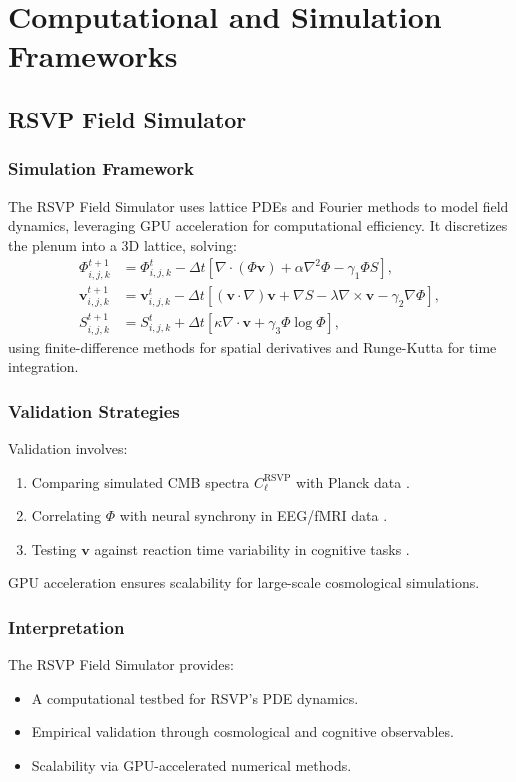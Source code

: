 \documentclass[12pt]{report}
\begin{document}
\part{Computational and Simulation Frameworks}

\chapter{RSVP Field Simulator}
\label{app:R}
\section{Simulation Framework}
The RSVP Field Simulator uses lattice PDEs and Fourier methods to model field dynamics, leveraging GPU acceleration for computational efficiency. It discretizes the plenum into a 3D lattice, solving:
\begin{align}
\Phi_{i,j,k}^{t+1} &= \Phi_{i,j,k}^t - \Delta t \left[ \nabla \cdot (\Phi \mathbf{v}) + \alpha \nabla^2 \Phi - \gamma_1 \Phi S \right], \\
\mathbf{v}_{i,j,k}^{t+1} &= \mathbf{v}_{i,j,k}^t - \Delta t \left[ (\mathbf{v}\cdot\nabla)\mathbf{v} + \nabla S - \lambda \nabla \times \mathbf{v} - \gamma_2 \nabla \Phi \right], \\
S_{i,j,k}^{t+1} &= S_{i,j,k}^t + \Delta t \left[ \kappa \nabla \cdot \mathbf{v} + \gamma_3 \Phi \log \Phi \right],
\end{align}
using finite-difference methods for spatial derivatives and Runge-Kutta for time integration.

\section{Validation Strategies}
Validation involves:
\begin{enumerate}
    \item Comparing simulated CMB spectra \(C_\ell^{\text{RSVP}}\) with Planck data \citep{Planck2020}.
    \item Correlating \(\Phi\) with neural synchrony in EEG/fMRI data \citep{Fries2005}.
    \item Testing \(\mathbf{v}\) against reaction time variability in cognitive tasks \citep{SemanticField2025}.
\end{enumerate}
GPU acceleration ensures scalability for large-scale cosmological simulations.

\section{Interpretation}
The RSVP Field Simulator provides:
\begin{itemize}
    \item A computational testbed for RSVP’s PDE dynamics.
    \item Empirical validation through cosmological and cognitive observables.
    \item Scalability via GPU-accelerated numerical methods.
\end{itemize}
\end{document}
